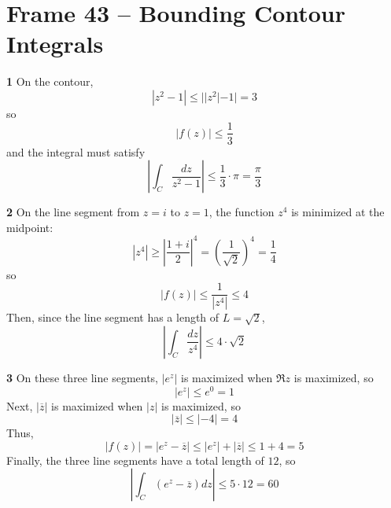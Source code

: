 \documentclass{article}
\renewcommand{\bar}{\overline}
\begin{document}
\clearpage
\section{Frame 43 -- Bounding Contour Integrals}
\textbf{1}
On the contour,
\[
	|z^2 - 1| \le ||z^2| - 1| = 3
\]
so
\[
	|f(z)| \le \frac{1}{3}
\]
and the integral must satisfy
\[
	\left| \int_C \frac{dz}{z^2 - 1} \right| \le \frac{1}{3} \cdot \pi = \frac{\pi}{3} 
\]


\textbf{2}
On the line segment from $z = i$ to $z = 1$, the function $z^4$ is minimized at the midpoint:
\[
	|z^4| 
	\ge \left| \frac{1 + i}{2} \right|^4 
	= \left(\frac{1}{\sqrt{2}} \right)^4
	= \frac{1}{4}
\]
so
\[
	|f(z)| 
	\le \frac{1}{|z^4|}
	\le 4
\]
Then, since the line segment has a length of $L = \sqrt{2}$,
\[
	\left| \int_C \frac{dz}{z^4} \right| \le 4 \cdot \sqrt{2}
\]


\textbf{3}
On these three line segments, $|e^z|$ is maximized when $\Re z$ is maximized, so
\[
	| e^z | \le e^0 = 1
\]
Next, $|\bar{z}|$ is maximized when $|z|$ is maximized, so
\[
	| \bar{z} | \le | -4 | = 4
\]
Thus,
\[
	|f(z)|
	= |e^z - \bar{z}|
	\le |e^z| + |\bar{z}|
	\le 1 + 4
	= 5
\]
Finally, the three line segments have a total length of $12$, so
\[
	\left| \int_C (e^z - \bar{z}) dz \right| \le 5 \cdot 12 = 60
\]
\end{document}
